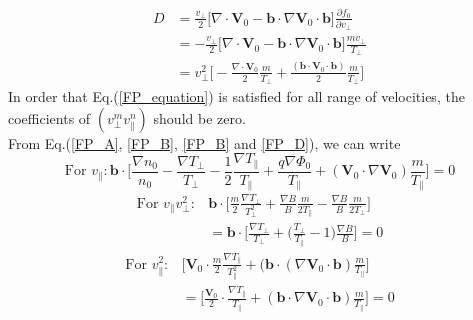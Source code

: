 \begin{equation}
    \begin{split}
        D&=\frac{v_\perp}{2}\big[\nabla \cdot \bm{V}_0 - \bm{b} \cdot \nabla \bm{V}_0 \cdot \bm{b}\big]\frac{\partial f_0}{\partial v_\perp} \\
        &=-\frac{v_\perp}{2}\big[\nabla \cdot \bm{V}_0 - \bm{b} \cdot \nabla \bm{V}_0 \cdot \bm{b}\big]\frac{mv_\perp}{T_\perp} \\
        &= v_\perp^2 \big[ -\frac{\nabla \cdot \bm{V}_0}{2}\frac{m}{T_\perp}+\frac{(\bm{b} \cdot \bm{V}_0 \cdot \bm{b})}{2}\frac{m}{T_\perp}\big]
    \label{FP_D}
    \end{split}
\end{equation}
In order that Eq.(\ref{FP_equation}) is satisfied for all range of velocities, the coefficients of $(v_\perp^m v_\parallel^n)$ should be zero. \\
From Eq.(\ref{FP_A}, \ref{FP_B}, \ref{FP_B} and \ref{FP_D}), we can write
\begin{equation}
    \text{For} \,\, v_\parallel : \boxed{\bm{b} \cdot \Big [ \frac{\nabla n_0}{n_0} - \frac{\nabla T_\perp}{T_\perp} - \frac{1}{2}\frac{\nabla T_\parallel}{T_\parallel}+\frac{q\nabla \Phi_0}{T_\parallel} +(\bm{V}_0 \cdot \nabla \bm{V}_0) \frac{m}{T_\parallel}\Big] =0}
\label{v_par}
\end{equation}
\begin{equation}
\begin{split}
    \text{For} \,\, v_\parallel v_\perp^2 : &\bm{b} \cdot \Big[ \frac{m}{2} \frac{\nabla T_\perp}{T_\perp^2} + \frac{\nabla B}{B}\frac{m}{2 T_\parallel} - \frac{\nabla B}{B}\frac{m}{2T_\perp}\Big] \\
    &= \boxed{\bm{b} \cdot \Big[ \frac{\nabla T_\perp}{T_\perp} + \Big(\frac{T_\perp}{T_\parallel}-1\Big)\frac{\nabla B}{B}\Big] = 0}
\label{v_par_perp2}
\end{split}
\end{equation}
\begin{equation}
\begin{split}
    \text{For} \,\, v_\parallel^2 : &\big[ \bm{V}_0 \cdot \frac{m}{2}\frac{\nabla T_\parallel}{T_\parallel^2} + (\bm{b} \cdot (\nabla \bm{V}_0 \cdot \bm{b}) \frac{m}{T_\parallel} \big] \\
    &= \boxed{\big[ \frac{\bm{V}_0}{2} \cdot \frac{\nabla T_\parallel}{T_\parallel} + (\bm{b} \cdot \nabla \bm{V}_0 \cdot \bm{b}) \frac{m}{T_\parallel}\big] = 0}
    \label{v_par2}
\end{split}
\end{equation}

